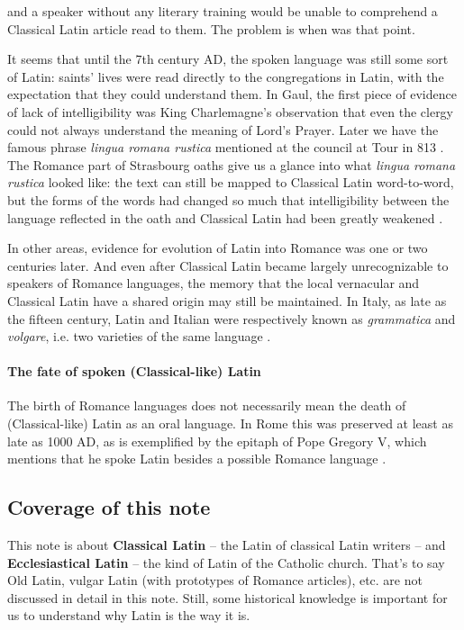 \documentclass[a4paper, oneside, 12pt]{report}
\newcommand*{\citepage}[1]{p.~{#1}}
\newcommand*{\citepages}[1]{pp.~{#1}}
\newcommand*{\concept}[1]{\textbf{#1}}
\newcommand{\form}[1]{\emph{#1}}
\begin{document}
and a speaker without any literary training would be unable to comprehend 
a Classical Latin article read to them.
The problem is when was that point.

It seems that until the 7th century AD, the spoken language was still some sort of Latin:
saints' lives were read directly to the congregations in Latin,
with the expectation that they could understand them.
In Gaul, the first piece of evidence of lack of intelligibility
was King Charlemagne's observation that even the clergy 
could not always understand the meaning of Lord's Prayer.
Later we have the famous phrase \form{lingua romana rustica}
mentioned at the council at Tour in 813
\citep[\citepage{114}]{herman2010vulgar}.
The Romance part of Strasbourg oaths give us a glance into what \form{lingua romana rustica} looked like:
the text can still be mapped to Classical Latin word-to-word,
but the forms of the words had changed so much
that intelligibility between the language reflected in the oath and Classical Latin
had been greatly weakened \citep[\citepages{300-301}]{clackson2011blackwell}.

In other areas, evidence for evolution of Latin into Romance was one or two centuries later.
And even after Classical Latin became largely unrecognizable
to speakers of Romance languages,
the memory that the local vernacular and Classical Latin have a shared origin
may still be maintained.
In Italy, as late as the fifteen century,
Latin and Italian were respectively known as \form{grammatica} and \form{volgare},
i.e. two varieties of the same language
\citep[\citepage{146}]{leonhardt2013latin}.

\paragraph*{The fate of spoken (Classical-like) Latin}
The birth of Romance languages does not necessarily mean 
the death of (Classical-like) Latin as an oral language.
In Rome this was preserved at least as late as 1000 AD,
as is exemplified by the epitaph of Pope Gregory V,
which mentions that he spoke Latin besides a possible Romance language 
\citep[\citepage{268}]{clackson2011blackwell}.

\subsection{Coverage of this note}

This note is about \concept{Classical Latin} -- the Latin of classical Latin writers -- 
and \concept{Ecclesiastical Latin} -- the kind of Latin of the Catholic church.
That's to say Old Latin, vulgar Latin (with prototypes of Romance articles), etc.
are not discussed in detail in this note.
Still, some historical knowledge is important for us to understand 
why Latin is the way it is. 
\end{document}
